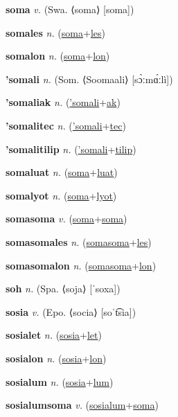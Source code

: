 \textbf{\hypertarget{soma}{soma}} \textit{v.} (Swa. ⟨soma⟩ [soma])


\textbf{\hypertarget{somales}{somales}} \textit{n.} (\hyperlink{soma}{soma}+\allowbreak \hyperlink{les}{les})


\textbf{\hypertarget{somalon}{somalon}} \textit{n.} (\hyperlink{soma}{soma}+\allowbreak \hyperlink{lon}{lon})


\textbf{\hypertarget{'somali}{'somali}} \textit{n.} (Som. ⟨Soomaali⟩ [sɔ̀ːmɑ́ːlì])


\textbf{\hypertarget{'somaliak}{'somaliak}} \textit{n.} (\hyperlink{'somali}{'somali}+\allowbreak \hyperlink{ak}{ak})


\textbf{\hypertarget{'somalitec}{'somalitec}} \textit{n.} (\hyperlink{'somali}{'somali}+\allowbreak \hyperlink{tec}{tec})


\textbf{\hypertarget{'somalitilip}{'somalitilip}} \textit{n.} (\hyperlink{'somali}{'somali}+\allowbreak \hyperlink{tilip}{tilip})


\textbf{\hypertarget{somaluat}{somaluat}} \textit{n.} (\hyperlink{soma}{soma}+\allowbreak \hyperlink{luat}{luat})


\textbf{\hypertarget{somalyot}{somalyot}} \textit{n.} (\hyperlink{soma}{soma}+\allowbreak \hyperlink{lyot}{lyot})


\textbf{\hypertarget{somasoma}{somasoma}} \textit{v.} (\hyperlink{soma}{soma}+\allowbreak \hyperlink{soma}{soma})


\textbf{\hypertarget{somasomales}{somasomales}} \textit{n.} (\hyperlink{somasoma}{somasoma}+\allowbreak \hyperlink{les}{les})


\textbf{\hypertarget{somasomalon}{somasomalon}} \textit{n.} (\hyperlink{somasoma}{somasoma}+\allowbreak \hyperlink{lon}{lon})


\textbf{\hypertarget{soh}{soh}} \textit{n.} (Spa. ⟨soja⟩ [ˈsoxa])


\textbf{\hypertarget{sosia}{sosia}} \textit{v.} (Epo. ⟨socia⟩ [soˈt͡sia])


\textbf{\hypertarget{sosialet}{sosialet}} \textit{n.} (\hyperlink{sosia}{sosia}+\allowbreak \hyperlink{let}{let})


\textbf{\hypertarget{sosialon}{sosialon}} \textit{n.} (\hyperlink{sosia}{sosia}+\allowbreak \hyperlink{lon}{lon})


\textbf{\hypertarget{sosialum}{sosialum}} \textit{n.} (\hyperlink{sosia}{sosia}+\allowbreak \hyperlink{lum}{lum})


\textbf{\hypertarget{sosialumsoma}{sosialumsoma}} \textit{v.} (\hyperlink{sosialum}{sosialum}+\allowbreak \hyperlink{soma}{soma})


